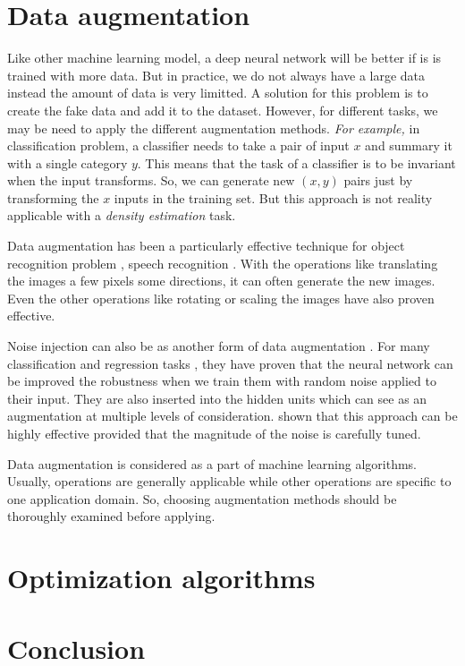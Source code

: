 \section{Data augmentation}
Like other machine learning model, a deep neural network will be better if is is trained with more data. But in practice, we do not always have a large data instead the amount of data is very limitted. A solution for this problem is to create the fake data and add it to the dataset. However, for different tasks, we may be need to apply the different augmentation methods. \textit{For example,} in classification problem, a classifier needs to take a pair of input $x$ and summary it with a single category $y$. This means that the task of a classifier is to be invariant when the input transforms. So, we can generate new $(x,y)$ pairs just by transforming the $x$ inputs in the training set. But this approach is not reality applicable with a \textit{density estimation} task.

Data augmentation has been a particularly effective technique for object recognition problem \cite{}, speech recognition \cite{}. With the operations like translating the images a few pixels some directions, it can often generate the new images. Even the other operations like rotating or scaling the images have also proven effective.

Noise injection can also be as another form of data augmentation \cite{}. For many classification and regression tasks \cite{}, they have proven that the neural network can be improved the robustness when we train them with random noise applied to their input. They are also inserted into the hidden units which can see as an augmentation at multiple levels of consideration. \cite{} shown that this approach can be highly effective provided that the magnitude of the noise is carefully tuned.

Data augmentation is considered as a part of machine learning algorithms. Usually, operations are generally applicable while other operations are specific to one application domain. So, choosing augmentation methods should be thoroughly examined before applying.

\section{Optimization algorithms}
\section{Conclusion}
